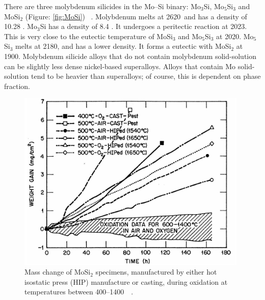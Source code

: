 There are three molybdenum silicides in the Mo--Si binary: Mo$_3$Si, Mo$_5$Si$_3$ and MoSi$_2$ (Figure: \ref{fig:MoSi}) ~\cite{svechnikov70}.  Molybdenum melts at 2620\celsius\ and has a density of 10.28  \gram\usk\centi\rpcubic\meter.  Mo$_3$Si has a density of 8.4  \gram\usk\centi\rpcubic\meter.  It undergoes a peritectic reaction at 2023\celsius.  This is very close to the eutectic temperature of MoSi$_3$ and Mo$_5$Si$_3$ at 2020\celsius.  Mo$_5$Si$_3$ melts at 2180\celsius, and has a lower density.  It forms a eutectic with MoSi$_2$ at 1900\celsius.  Molybdenum silicide alloys that do not contain molybdenum solid-solution can be slightly less dense nickel-based superalloys.  Alloys that contain Mo solid-solution tend to be heavier than superalloys; of course, this is dependent on phase fraction.
%
\vspace{6mm}
\begin{figure}[H]
\begin{center}
\includegraphics[width=11cm]{MoSi2_oxidation}
\caption{Mass change of MoSi$_2$ specimens, manufactured by either hot isostatic press (HIP) manufacture or casting, during oxidation at temperatures between 400--1400\celsius\ ~\cite{inui00}.}
\label{fig:MoSi2_oxidation}
\end{center}
\end{figure}
\vspace{-5mm}
%


